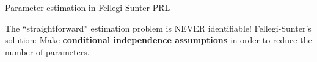 \begin{frame}{\vskip -0.3cm \Large Parameter estimation in Fellegi-Sunter PRL}
\pause

\scriptsize
\begin{center}
\vskip 0.1cm
The ``straightforward'' estimation problem is NEVER identifiable!\;
\pause
Fellegi-Sunter's solution:
\pause
\vskip 0.05cm
\normalsize
Make \textbf{\color{red}conditional independence assumptions}
\vskip -0.05cm
in order to reduce the number of parameters.
\end{center}

\end{frame}
\normalsize

